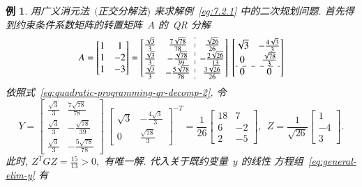 \documentclass{SBCbookchapter}
\newtheorem{exam}[thm]{例}
\numberwithin{equation}{section}
\begin{document}
\begin{exam}\label{eg:7.2.2}
用广义消元法~$($正交分解法$)$ 来求解例~\eqref{eg:7.2.1} 中的二次规划问题. 首先得到约束条件系数矩阵的转置矩阵~$A$ 的~{\rm QR} 分解
\begin{equation*}
A = \begin{bmatrix} 1 & 1 \\ 1 & -2 \\ 1 & -3 \end{bmatrix} = \left[\begin{array}{@{}cc:c@{}} \frac{\sqrt{3}}{3} & \frac{7 \sqrt{78}}{78} & \frac{\sqrt{26}}{26} \\ \frac{\sqrt{3}}{3} & - \frac{\sqrt{78}}{39} & - \frac{2 \sqrt{26}}{13} \\ \frac{\sqrt{3}}{3} & - \frac{5 \sqrt{78}}{78} & \frac{3 \sqrt{26}}{26} \end{array}\right] ~ \left[\begin{array}{@{}cc@{}} \sqrt{3} & - \frac{4 \sqrt{3}}{3} \\ 0 & \frac{\sqrt{78}}{3} \\ \hdashline 0 & 0 \end{array}\right]
\end{equation*}
依照式~\eqref{eq:quadratic-programming-qr-decomp-2}, 令
\begin{equation*}
Y = \left[\begin{matrix} \frac{\sqrt{3}}{3} & \frac{7 \sqrt{78}}{78} \\ \frac{\sqrt{3}}{3} & - \frac{\sqrt{78}}{39} \\ \frac{\sqrt{3}}{3} & - \frac{5 \sqrt{78}}{78} \end{matrix}\right] ~ \left[\begin{matrix} \sqrt{3} & - \frac{4 \sqrt{3}}{3} \\ 0 & \frac{\sqrt{78}}{3} \end{matrix}\right]^{-T} = \frac{1}{26} \left[\begin{matrix} 18 & 7 \\ 6 & -2 \\ 2 & -5 \end{matrix}\right], ~~ Z = \frac{1}{\sqrt{26}} \left[\begin{matrix} 1 \\ -4 \\ 3 \end{matrix}\right].
\end{equation*}
此时, $Z^T G Z = \frac{15}{13} > 0,$ 有唯一解. 代入关于既约变量~$y$ 的线性
方程组~\eqref{eq:general-elim-y} 有
\begin{equation*}

\end{equation*}
\end{exam}
\end{document}
